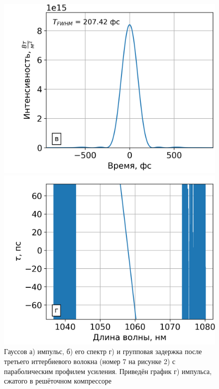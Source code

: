 \documentclass[12pt]{article}
\begin{document}
\begin{figure}[h!]
  \vspace{}

  \begin{minipage}[b]{0.5\textwidth}
    \includegraphics[width=\linewidth]{Images/Gauss Pulse Parabolic Profile/После компрессора/23 элемент gamma=49.59073 l_g=0.37532 сжатие}
  \end{minipage}%
  \begin{minipage}[b]{0.5\textwidth}
    \includegraphics[width=\linewidth]{Images/Gauss Pulse Parabolic Profile/Импульс и спектр/!23. Fiber_time_delay}
  \end{minipage}

  \caption{Гауссов а) импульс, б) его спектр г) и групповая задержка после третьего иттербиевого волокна (номер 7 на
  рисунке 2) с параболическим профилем усиления. Приведён график г) импульса, сжатого в решёточном компрессоре}
  \label{fig:both}
\end{figure}
\end{document}
